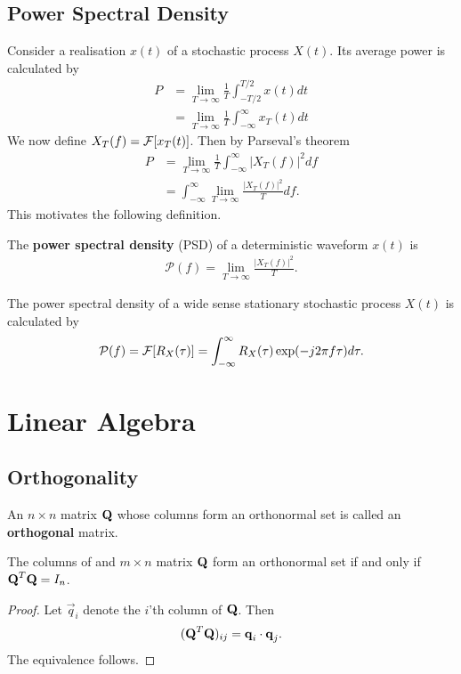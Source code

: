 \documentclass{memoir}
\begin{document}
\subsection{Power Spectral Density}
Consider a realisation $x(t)$ of a stochastic process $X(t)$. Its average power is calculated by
\begin{align*}
    P &= \lim_{T \to \infty} \frac{1}{T} \int_{-T/2}^{T/2} x(t) dt \\
    &= \lim_{T \to \infty} \frac{1}{T} \int_{-\infty}^{\infty} x_T(t) dt
\end{align*}
We now define $X_T(f) = \mathcal{F}[x_T(t)]$. Then by Parseval's theorem
\begin{align*}
    P &= \lim_{T \to \infty} \frac{1}{T} \int_{-\infty}^{\infty} |X_T(f)|^2 df \\
    &= \int_{-\infty}^{\infty} \lim_{T \to \infty} \frac{|X_T(f)|^2}{T} df.
\end{align*}
This motivates the following definition.
\begin{definition}
    The \textbf{power spectral density} (PSD) of a deterministic waveform $x(t)$ is
    \begin{align*}
        \mathcal{P}(f) = \lim_{T \to \infty} \frac{|X_T(f)|^2}{T}.
    \end{align*}
\end{definition}

\begin{theorem}
    The power spectral density of a wide sense stationary stochastic process $X(t)$ is calculated by
    \begin{align*}
        \mathcal{P}(f) = \mathcal{F}[R_X(\tau)] = \int_{-\infty}^{\infty} R_X(\tau) \exp(-j2\pi f \tau) d \tau.
    \end{align*}
\end{theorem}

\section{Linear Algebra}
\subsection{Orthogonality}
\begin{definition}
    An $n \times n$ matrix $\boldsymbol{\mathbf{Q}}$ whose columns form an orthonormal set is called an \textbf{orthogonal} matrix.
\end{definition}

\begin{theorem}
    The columns of and $m \times n$ matrix $\boldsymbol{\mathbf{Q}}$ form an orthonormal set if and only if $\boldsymbol{\mathbf{Q}}^T \boldsymbol{\mathbf{Q}}=I_n$.
\end{theorem}
\begin{proof}
    Let $\vec{q}_i$ denote the $i$'th column of $\boldsymbol{\mathbf{Q}}$. Then
    \begin{align*}
        (\boldsymbol{\mathbf{Q}}^T \boldsymbol{\mathbf{Q}})_{ij} = \boldsymbol{\mathbf{q}}_i \cdot \boldsymbol{\mathbf{q}}_j.
    \end{align*}
    The equivalence follows.
\end{proof}
\end{document}
